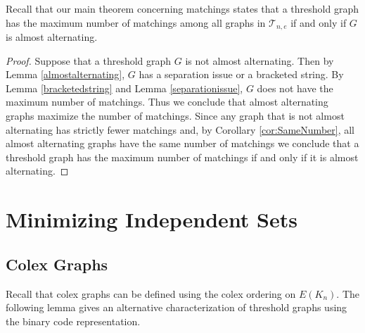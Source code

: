 \documentclass[12pt]{amsart}
\theoremstyle{plain}
\newtheorem{thm}{Theorem}[section]
\theoremstyle{definition}
\newcommand{\cT}{\mathcal{T}}
\begin{document}
Recall that our main theorem concerning matchings states that a threshold graph has the maximum number of matchings among all graphs in $\cT_{n,e}$ if and only if $G$ is almost alternating.  


\begin{proof}
Suppose that a threshold graph $G$ is not  almost alternating. Then by Lemma \ref{almostalternating}, $G$ has a separation issue or a bracketed string.  By Lemma  \ref{bracketedstring} and Lemma \ref{separationissue}, $G$ does not have the maximum number of matchings.  Thus we conclude that almost alternating graphs maximize the number of matchings.  Since any graph that is not almost alternating has strictly fewer matchings and, by Corollary \ref{cor:SameNumber}, all almost alternating graphs have the same number of matchings we conclude that a threshold graph has the maximum number of matchings if and only if it is almost alternating.  
\end{proof}



\section{Minimizing Independent Sets}\label{sec:ind}

\subsection{Colex Graphs}\label{sec:colex}

Recall that colex graphs can be defined using the colex ordering on $E(K_n)$.  The following lemma gives an alternative characterization of threshold graphs using the binary code representation.
\end{document}
